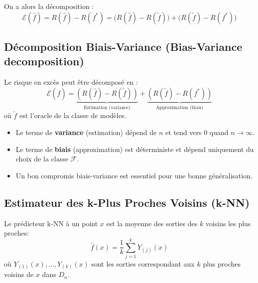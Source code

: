 On a alors la décomposition :
\begin{equation}
\mathcal{E}(\hat{f}) = R(\hat{f}) - R(f^{*}) = \big(R(\hat{f}) - R(\tilde{f})\big) + \big(R(\tilde{f}) - R(f^{*})\big)
\end{equation}

\subsection{Décomposition Biais-Variance (Bias-Variance decomposition)}

\begin{theoreme}
Le risque en excès peut être décomposé en :
\begin{equation}
\mathcal{E}(\hat{f}) = \underbrace{(R(\hat{f})-R(\tilde{f}))}_{\text{Estimation (variance)}} + \underbrace{(R(\tilde{f})-R(f^{*}))}_{\text{Approximation (biais)}}
\end{equation}
où $\tilde{f}$ est l'oracle de la classe de modèles.
\end{theoreme}

\begin{remarque}
\begin{itemize}
    \item Le terme de \textbf{variance} (estimation) dépend de $n$ et tend vers 0 quand $n \to \infty$.
    \item Le terme de \textbf{biais} (approximation) est déterministe et dépend uniquement du choix de la classe $\mathcal{F}$.
    \item Un bon compromis biais-variance est essentiel pour une bonne généralisation.
\end{itemize}
\end{remarque}

\subsection{Estimateur des k-Plus Proches Voisins (k-NN)}

\begin{definition}[Estimateur k-NN]\label{def:knn_regression}
Le prédicteur k-NN à un point $x$ est la moyenne des sorties des $k$ voisins les plus proches:
\begin{equation}
\hat{f}(x)=\frac{1}{k}\sum_{j=1}^{k}Y_{(j)}(x)
\end{equation}
où $Y_{(1)}(x), \ldots, Y_{(k)}(x)$ sont les sorties correspondant aux $k$ plus proches voisins de $x$ dans $D_n$.
\end{definition}


